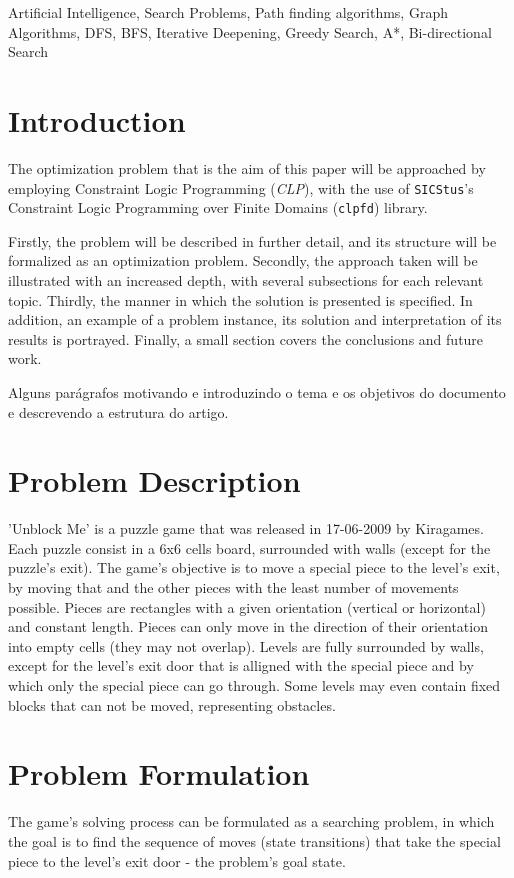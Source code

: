 \documentclass[conference]{IEEEtran}
\begin{document}
\begin{IEEEkeywords}
Artificial Intelligence, Search Problems, Path finding algorithms, Graph Algorithms, DFS, BFS, Iterative Deepening, Greedy Search, A*, Bi-directional Search
\end{IEEEkeywords}

\section{Introduction}
The optimization problem that is the aim of this paper will be approached by employing Constraint Logic Programming (\textit{CLP}), with the use of \verb;SICStus;'s Constraint Logic Programming over Finite Domains (\verb;clpfd;) library.

Firstly, the problem will be described in further detail, and its structure will be formalized as an optimization problem. Secondly, the approach taken will be illustrated with an increased depth, with several subsections for each relevant topic. Thirdly, the manner in which the solution is presented is specified. In addition, an example of a problem instance, its solution and interpretation of its results is portrayed. Finally, a small section covers the conclusions and future work.

Alguns parágrafos motivando e introduzindo o tema e os objetivos do documento e descrevendo a estrutura do artigo.

\section{Problem Description}
'Unblock Me' is a puzzle game that was released in 17-06-2009 by Kiragames. Each puzzle consist in a 6x6 cells board, surrounded with walls (except for the puzzle's exit). The game's objective is to move a special piece to the level's exit, by moving that and the other pieces with the least number of movements possible. Pieces are rectangles with a given orientation (vertical or horizontal) and constant length. Pieces can only move in the direction of their orientation into empty cells (they may not overlap). Levels are fully surrounded by walls, except for the level's exit door that is alligned with the special piece and by which only the special piece can go through. Some levels may even contain fixed blocks that can not be moved, representing obstacles.

\section{Problem Formulation}
The game's solving process can be formulated as a searching problem, in which the goal is to find the sequence of moves (state transitions) that take the special piece to the level's exit door - the problem's goal state. 
\end{document}
